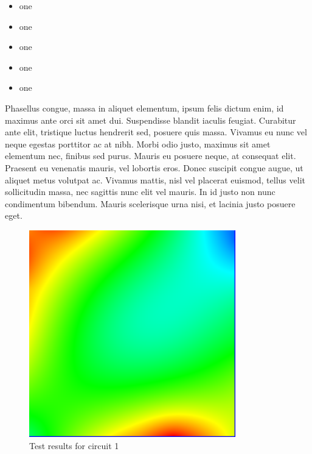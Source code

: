 \documentclass[a4paper,12pt]{article}
\begin{document}
\begin{itemize}
    \item one
    \item one
    \item one
    \item one
    \item one
    
\end{itemize}

Phasellus congue, massa in aliquet elementum, ipsum felis dictum enim, id maximus ante orci sit amet dui. Suspendisse blandit iaculis feugiat. Curabitur ante elit, tristique luctus hendrerit sed, posuere quis massa. Vivamus eu nunc vel neque egestas porttitor ac at nibh. Morbi odio justo, maximus sit amet elementum nec, finibus sed purus. Mauris eu posuere neque, at consequat elit. Praesent eu venenatis mauris, vel lobortis eros. Donec suscipit congue augue, ut aliquet metus volutpat ac. Vivamus mattis, nisl vel placerat euismod, tellus velit sollicitudin massa, nec sagittis nunc elit vel mauris. In id justo non nunc condimentum bibendum. Mauris scelerisque urna nisi, et lacinia justo posuere eget. 
\begin{figure}[ht!]
    \centering
    \includegraphics[width=0.8\textwidth]{img/eg.png} %
    \caption{Test results for circuit 1}
    \label{fig:circuit1}
\end{figure}
\end{document}
